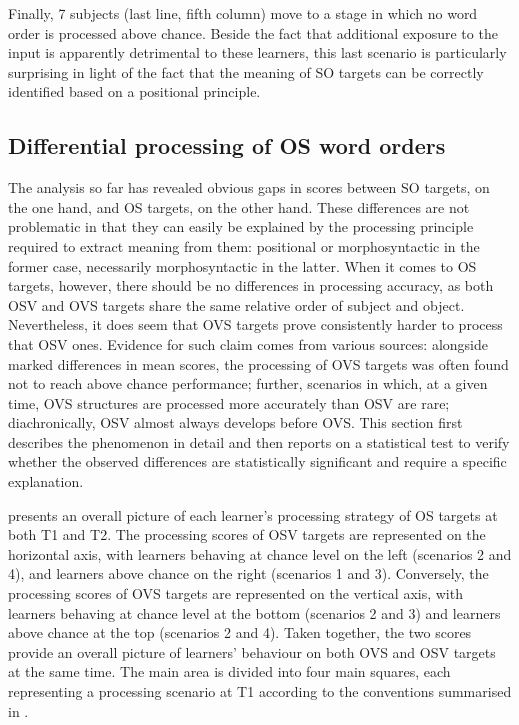 Finally, 7 subjects (last line, fifth column) move to a stage in which no word order is processed above chance. Beside the fact that additional exposure to the input is apparently detrimental to these learners, this last scenario is particularly surprising in light of the fact that the meaning of SO targets can be correctly identified based on a positional principle.

\subsection{Differential processing of OS word orders}\label{sec:05:2.5}

The analysis so far has revealed obvious gaps in scores between SO targets, on the one hand, and OS targets, on the other hand. These differences are not problematic in that they can easily be explained by the processing principle required to extract meaning from them: positional or morphosyntactic in the former case, necessarily morphosyntactic in the latter. When it comes to OS targets, however, there should be no differences in processing accuracy, as both OSV and OVS targets share the same relative order of subject and object. Nevertheless, it does seem that OVS targets prove consistently harder to process that OSV ones. Evidence for such claim comes from various sources: alongside marked differences in mean scores, the processing of OVS targets was often found not to reach above chance performance; further, scenarios in which, at a given time, OVS structures are processed more accurately than OSV are rare; diachronically, OSV almost always develops before OVS. This section first describes the phenomenon in detail and then reports on a statistical test to verify whether the observed differences are statistically significant and require a specific explanation.

 presents an overall picture of each learner's processing strategy of OS targets at both T1 and T2. The processing scores of OSV targets are represented on the horizontal axis, with learners behaving at chance level on the left (scenarios 2 and 4), and learners above chance on the right (scenarios 1 and 3). Conversely, the processing scores of OVS targets are represented on the vertical axis, with learners behaving at chance level at the bottom (scenarios 2 and 3) and learners above chance at the top (scenarios 2 and 4). Taken together, the two scores provide an overall picture of learners' behaviour on both OVS and OSV targets at the same time. The main area is divided into four main squares, each representing a processing scenario at T1 according to the conventions summarised in .

